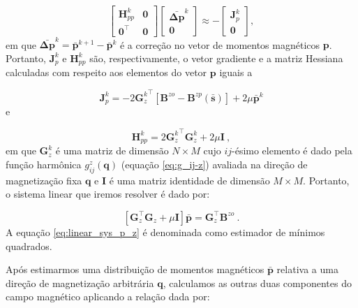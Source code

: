 \begin{equation}
\left[
\begin{array}{c|c}
\mathbf{H}_{pp}^{k} & \mathbf{0} \\
\hline
\mathbf{0}^{\top} & \mathbf{0}
\end{array}
\right] \left[ \begin{array}{c}
\bar{\mathbf{\Delta p}}^{k} \\ 
\mathbf{0} 
\end{array} \right] \approx -\left[ \begin{array}{c}
\mathbf{J}_{p}^{k} \\ 
\mathbf{0} 
\end{array} \right] ,
\label{eq:linear_sys_GN_block}
\end{equation}
em que $\bar{\mathbf{\Delta p}}^{k} = \bar{\mathbf{p}}^{k+1} - \bar{\mathbf{p}}^{k}$ é a correção no vetor de momentos magnéticos $\mathbf{p}$. Portanto, $\mathbf{J}_{p}^{k}$ e $\mathbf{H}_{pp}^{k}$ são, respectivamente, o vetor gradiente e a matriz Hessiana calculadas com respeito aos elementos do vetor $\mathbf{p}$ iguais a 

\begin{equation}
\mathbf{J}_{p}^{k} = -2 {\mathbf{G}_{z}^{k}}^{\top} 
\left[  \mathbf{B}^{zo} - \mathbf{B}^{zp} (\bar{\mathbf{s}})  \right] + 
2\mu \bar{\mathbf{p}}^{k} 
\label{eq:grad_p}
\end{equation}
e 

\begin{equation}
\mathbf{H}_{pp}^{k} = 2 {\mathbf{G}_{z}^{k}}^{\top} \mathbf{G}_{z}^{k} + 
2 \mu \mathbf{I} \: ,
\label{eq:hess_p}
\end{equation}
em que $\mathbf{G}_{z}^{k}$ é uma matriz de dimensão $N \times M$ cujo $ij$-ésimo elemento é dado pela função harmônica $g_{ij}^{z}(\mathbf{q})$ (equação \ref{eq:g_ij-z}) avaliada na direção de magnetização fixa $\mathbf{q}$ e $\mathbf{I}$ é uma matriz identidade de dimensão $M \times M$. Portanto, o sistema linear que iremos resolver é dado por:

\begin{equation}
\left[ \mathbf{G}_{z}^{\top} \mathbf{G}_{z} + \mu \mathbf{I} \right] \bar{\mathbf{p}} = \mathbf{G}_{z}^{\top} \mathbf{B}^{zo} \: .
\label{eq:linear_sys_p_z}
\end{equation}
A equação \ref{eq:linear_sys_p_z} é denominada como estimador de mínimos quadrados. 

Após estimarmos uma distribuição de momentos magnéticos $\bar{\mathbf{p}}$ relativa a uma direção de magnetização arbitrária $\mathbf{q}$, calculamos as outras duas componentes do campo magnético aplicando a relação dada por:

